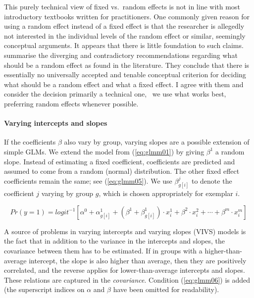 This purely technical view of fixed vs.\ random effects is not in line with most introductory textbooks written for practitioners.
One commonly given reason for using a random effect instead of a fixed effect is that the researcher is allegedly not interested in the individual levels of the random effect or similar, seemingly conceptual arguments.
It appears that there is little foundation to such claims.
\citet[245--247]{GelmanHill2006} summarise the diverging and contradictory recommendations regarding what should be a random effect as found in the literature.
They conclude that there is essentially no universally accepted and tenable conceptual criterion for deciding what should be a random effect and what a fixed effect.
I agree with them and consider the decision primarily a technical one, \ie\ we use what works best, preferring random effects whenever possible.

\paragraph{Varying intercepts and slopes}

If the coefficients $\beta$ also vary by group, varying slopes are a possible extension of simple GLMs.
We extend the model from (\ref{eq:glmm01}) by giving $\beta^1$ a random slope.
Instead of estimating a fixed coefficient, coefficients are predicted and assumed to come from a random (normal) distribution.
The other fixed effect coefficients remain the same; see (\ref{eq:glmm05}).
We use $\beta^j_{g[i]}$ to denote the coefficient $j$ varying by group $g$, which is chosen appropriately for exemplar $i$.

\begin{equation}
  Pr(y=1)=logit^{-1}\left[\alpha^0+\alpha^1_{g[i]}+(\beta^1+\beta^1_{g[i]})\cdot x^1_i +\beta^2\cdot x^2_i+\cdots+\beta^m\cdot x^m_i\right]
  \label{eq:glmm05}
\end{equation}

A source of problems in varying intercepts and varying slopes (VIVS) models is the fact that in addition to the variance in the intercepts and slopes, the covariance between them has to be estimated.
If in groups with a higher-than-average intercept, the slope is also higher than average, then they are positively correlated, and the reverse applies for lower-than-average intercepts and slopes.
These relations are captured in the \textit{covariance}.
Condition (\ref{eq:glmm06}) is added (the superscript indices on $\alpha$ and $\beta$ have been omitted for readability).

